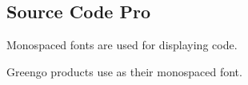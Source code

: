 \documentclass[letterpaper,10pt,english]{sphinxmanual}
\begin{document}
\begin{figure}[htbp]
\centering

\noindent{}
\end{figure}


\subsection{Source Code Pro}
\label{\detokenize{design/fonts:source-code-pro}}
Monospaced fonts are used for displaying code.

Greengo products use  as their monospaced font.

\begin{figure}[htbp]
\centering

\noindent{}
\end{figure}
\end{document}
